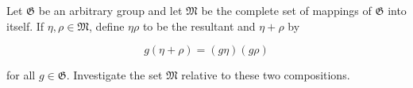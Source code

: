 Let $\mathfrak{G}$ be an arbitrary group and let $\mathfrak{M}$ be the complete set of mappings of $\mathfrak{G}$ into itself. If $\eta, \rho \in \mathfrak{M}$, define $\eta\rho$ to be the resultant and $\eta + \rho$ by

$$g(\eta + \rho) = (g\eta)(g\rho)$$

for all $g \in \mathfrak{G}$. Investigate the set $\mathfrak{M}$ relative to these two compositions.
